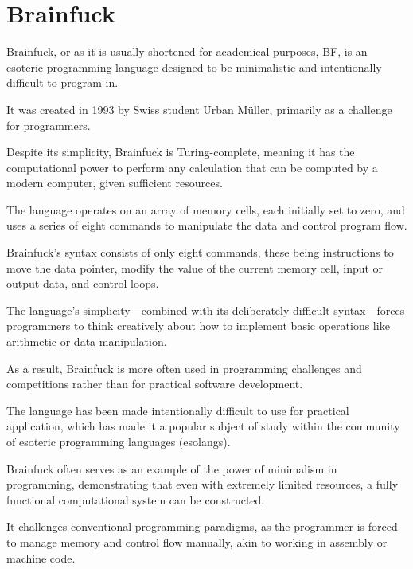 \chapter{Brainfuck}
\label{chap:ch2}

\par Brainfuck, or as it is usually shortened for academical purposes, BF, is an esoteric programming language designed to be minimalistic and intentionally difficult to program in.

\par It was created in 1993 by Swiss student Urban Müller, primarily as a challenge for programmers.

\par Despite its simplicity, Brainfuck is Turing-complete, meaning it has the computational power to perform any calculation that can be computed by a modern computer, given sufficient resources.

\par The language operates on an array of memory cells, each initially set to zero, and uses a series of eight commands to manipulate the data and control program flow.

\par Brainfuck's syntax consists of only eight commands, these being instructions to move the data pointer, modify the value of the current memory cell, input or output data, and control loops.

\par The language's simplicity—combined with its deliberately difficult syntax—forces programmers to think creatively about how to implement basic operations like arithmetic or data manipulation.

\par As a result, Brainfuck is more often used in programming challenges and competitions rather than for practical software development.

\par The language has been made intentionally difficult to use for practical application, which has made it a popular subject of study within the community of esoteric programming languages (esolangs).

\par Brainfuck often serves as an example of the power of minimalism in programming, demonstrating that even with extremely limited resources, a fully functional computational system can be constructed.

\par It challenges conventional programming paradigms, as the programmer is forced to manage memory and control flow manually, akin to working in assembly or machine code.

